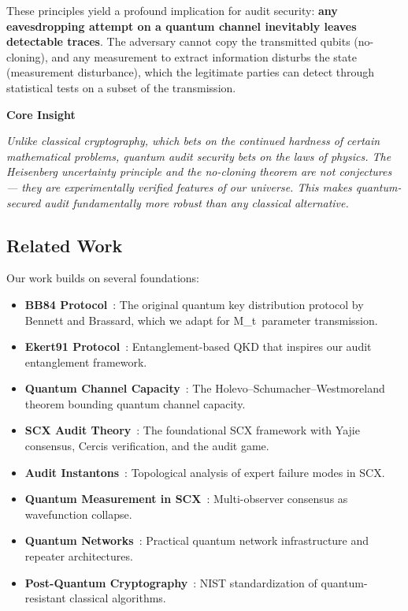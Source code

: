 \documentclass[11pt,a4paper]{article}
\theoremstyle{plain}
\theoremstyle{definition}
\theoremstyle{remark}
\newenvironment{bilingual}[2]{%
  \medskip\noindent\textbf{#1}\par\noindent\textit{#2}\par\smallskip
}{}
\newcommand{\Mt}{M_t}
\begin{document}
These principles yield a profound implication for audit security:
\textbf{any eavesdropping attempt on a quantum channel inevitably leaves
detectable traces}. The adversary cannot copy the transmitted qubits
(no-cloning), and any measurement to extract information disturbs the state
(measurement disturbance), which the legitimate parties can detect through
statistical tests on a subset of the transmission.

\begin{bilingual}
{Core Insight}
{Unlike classical cryptography, which bets on the continued hardness of
certain mathematical problems, quantum audit security bets on the laws of
physics. The Heisenberg uncertainty principle and the no-cloning theorem
are not conjectures — they are experimentally verified features of our
universe. This makes quantum-secured audit fundamentally more robust than
any classical alternative.}
\end{bilingual}

\subsection{Related Work}
\label{sec:related}

Our work builds on several foundations:

\begin{itemize}
  \item \textbf{BB84 Protocol}~\cite{bb84}: The original quantum key
        distribution protocol by Bennett and Brassard, which we adapt for
        \Mt\ parameter transmission.
  \item \textbf{Ekert91 Protocol}~\cite{ekert1991}: Entanglement-based
        QKD that inspires our audit entanglement framework.
  \item \textbf{Quantum Channel Capacity}~\cite{holevo1998,schumacher1996}:
        The Holevo--Schumacher--Westmoreland theorem bounding quantum
        channel capacity.
  \item \textbf{SCX Audit Theory}~\cite{scx_audit}: The foundational
        SCX framework with Yajie consensus, Cercis verification, and
        the audit game.
  \item \textbf{Audit Instantons}~\cite{audit_instanton}: Topological
        analysis of expert failure modes in SCX.
  \item \textbf{Quantum Measurement in SCX}~\cite{quantum_measurement}:
        Multi-observer consensus as wavefunction collapse.
  \item \textbf{Quantum Networks}~\cite{quantum_internet}: Practical
        quantum network infrastructure and repeater architectures.
  \item \textbf{Post-Quantum Cryptography}~\cite{nist_pqc}: NIST
        standardization of quantum-resistant classical algorithms.
\end{itemize}
\end{document}
